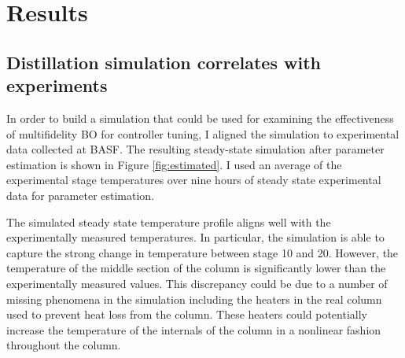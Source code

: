 \section{Results}

\subsection{Distillation simulation correlates with experiments}

In order to build a simulation that could be used for examining the effectiveness of multifidelity BO for controller tuning, I aligned the simulation to experimental data collected at BASF. The resulting steady-state simulation after parameter estimation is shown in Figure \ref{fig:estimated}. I used an average of the experimental stage temperatures over nine hours of steady state experimental data for parameter estimation. 

The simulated steady state temperature profile aligns well with the experimentally measured temperatures. In particular, the simulation is able to capture the strong change in temperature between stage 10 and 20. However, the temperature of the middle section of the column is significantly lower than the experimentally measured values. This discrepancy could be due to a number of missing phenomena in the simulation including the heaters in the real column used to prevent heat loss from the column. These heaters could potentially increase the temperature of the internals of the column in a nonlinear fashion throughout the column. 

